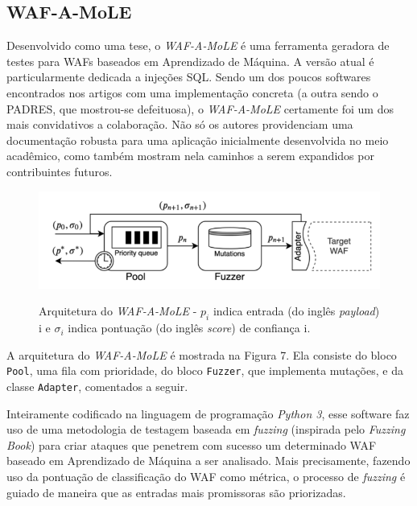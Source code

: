 \subsection{WAF-A-MoLE}

Desenvolvido como uma tese, o \textit{WAF-A-MoLE} \cite{valenza_waf--mole_2020} é uma ferramenta geradora de testes para WAFs baseados em Aprendizado de Máquina. A versão atual é particularmente dedicada a injeções SQL. Sendo um dos poucos softwares encontrados nos artigos com uma implementação concreta (a outra sendo o PADRES, que mostrou-se defeituosa), o \textit{WAF-A-MoLE} certamente foi um dos mais convidativos a colaboração. Não só os autores providenciam uma documentação robusta para uma aplicação inicialmente desenvolvida no meio acadêmico, como também mostram nela caminhos a serem expandidos por contribuintes futuros.

\begin{figure}[ht]
    \centering
    \caption{Arquitetura do \textit{WAF-A-MoLE} - $p_i$ indica entrada (do inglês \textit{payload}) i e $\sigma_i$  indica pontuação (do inglês \textit{score}) de confiança i.}
    \includegraphics[width=14cm]{figuras/wafamoleArchitecture.png} 
    \label{fig:internet} 
\end{figure}


A arquitetura do \textit{WAF-A-MoLE} é mostrada na Figura 7. Ela consiste do bloco \verb+Pool+, uma fila com prioridade, do bloco \verb+Fuzzer+, que implementa mutações, e da classe \verb+Adapter+, comentados a seguir. 

Inteiramente codificado na linguagem de programação \textit{Python 3}, esse software faz uso de uma metodologia de testagem baseada em \textit{fuzzing} (inspirada pelo \textit{Fuzzing Book}) \cite{fuzzing_book} para criar ataques que penetrem com sucesso um determinado WAF baseado em Aprendizado de Máquina a ser analisado. Mais precisamente, fazendo uso da pontuação de classificação do WAF como métrica, o processo de \textit{fuzzing} é guiado de maneira que as entradas mais promissoras são priorizadas.

